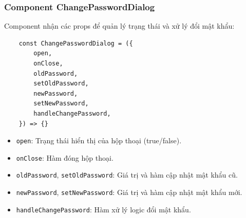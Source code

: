             \subsubsection{Component ChangePasswordDialog}
                \hspace*{0.6cm}Component nhận các props để quản lý trạng thái và xử lý đổi mật khẩu:
                \begin{lstlisting}
    const ChangePasswordDialog = ({
        open,
        onClose,
        oldPassword,
        setOldPassword,
        newPassword,
        setNewPassword,
        handleChangePassword,
    }) => {}
                \end{lstlisting}
                \begin{itemize}
                    \item \texttt{open}: Trạng thái hiển thị của hộp thoại (true/false).
                    \item \texttt{onClose}: Hàm đóng hộp thoại.
                    \item \texttt{oldPassword}, \texttt{setOldPassword}: Giá trị và hàm cập nhật mật khẩu cũ.
                    \item \texttt{newPassword}, \texttt{setNewPassword}: Giá trị và hàm cập nhật mật khẩu mới.
                    \item \texttt{handleChangePassword}: Hàm xử lý logic đổi mật khẩu.
                \end{itemize}

